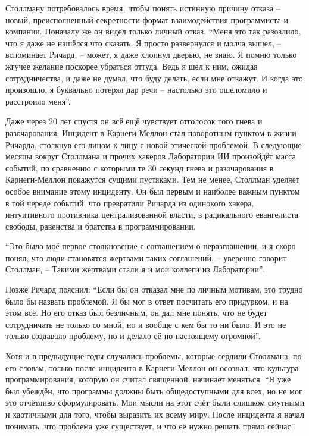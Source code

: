 Столлману потребовалось время, чтобы понять истинную причину отказа -- новый, преисполненный секретности формат взаимодействия программиста и компании. Поначалу же он видел только личный отказ. \enquote{Меня это так разозлило, что я даже не нашёлся что сказать. Я просто развернулся и молча вышел, -- вспоминает Ричард, -- может, я даже хлопнул дверью, не знаю. Я помню только жгучее желание поскорее убраться оттуда. Ведь я шёл к ним, ожидая сотрудничества, и даже не думал, что буду делать, если мне откажут. И когда это произошло, я буквально потерял дар речи -- настолько это ошеломило и расстроило меня}.

Даже через 20 лет спустя он всё ещё чувствует отголосок того гнева и разочарования. Инцидент в Карнеги-Меллон стал поворотным пунктом в жизни Ричарда, столкнув его лицом к лицу с новой этической проблемой. В следующие месяцы вокруг Столлмана и прочих хакеров Лаборатории ИИ произойдёт масса событий, по сравнению с которыми те 30 секунд гнева и разочарования в Карнеги-Меллон покажутся сущими пустяками. Тем не менее, Столлман уделяет особое внимание этому инциденту. Он был первым и наиболее важным пунктом в той череде событий, что превратили Ричарда из одинокого хакера, интуитивного противника централизованной власти, в радикального евангелиста свободы, равенства и братства в программировании.

\enquote{Это было моё первое столкновение с соглашением о неразглашении, и я скоро понял, что люди становятся жертвами таких соглашений, -- уверенно говорит Столлман, --  Такими жертвами стали я и мои коллеги из Лаборатории}.

Позже Ричард пояснил: \enquote{Если бы он отказал мне по личным мотивам, это трудно было бы назвать проблемой. Я бы мог в ответ посчитать его придурком, и на этом всё. Но его отказ был безличным, он дал мне понять, что не будет сотрудничать не только со мной, но и вообще с кем бы то ни было. И это не только создавало проблему, но и делало её по-настоящему огромной}.

Хотя и в предыдущие годы случались проблемы, которые сердили Столлмана, по его словам, только после инцидента в Карнеги-Меллон он осознал, что культура программирования, которую он считал священной, начинает меняться. \enquote{Я уже был убеждён, что программы должны быть общедоступными для всех, но не мог это отчётливо сформулировать. Мои мысли на этот счёт были слишком смутными и хаотичными для того, чтобы выразить их всему миру. После инцидента я начал понимать, что проблема уже существует, и что её нужно решать прямо сейчас}.

